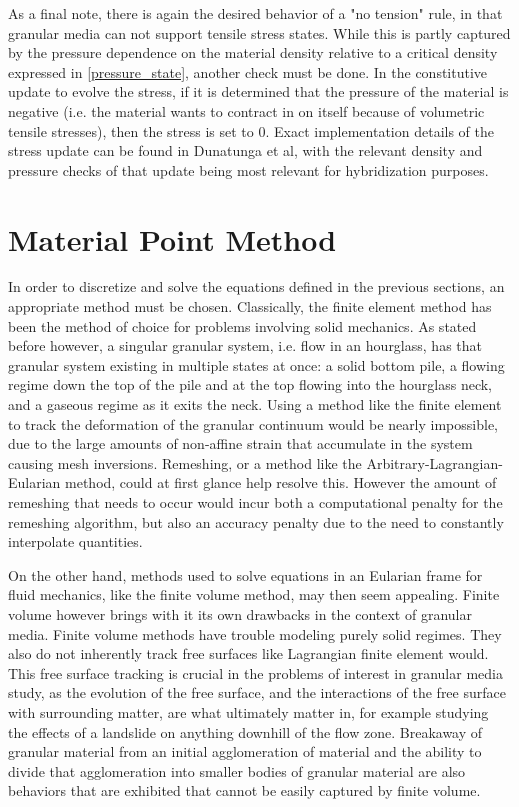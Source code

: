 As a final note, there is again the desired behavior of a "no tension" rule, in that granular media can not support tensile stress states. While this is partly captured by the pressure dependence on the material density relative to a critical density expressed in \ref{pressure_state}, another check must be done. In the constitutive update to evolve the stress, if it is determined that the pressure of the material is negative (i.e. the material wants to contract in on itself because of volumetric tensile stresses), then the stress is set to 0. Exact implementation details of the stress update can be found in Dunatunga et al, with the relevant density and pressure checks of that update being most relevant for hybridization purposes. 

\section{Material Point Method}
In order to discretize and solve the equations defined in the previous sections, an appropriate method must be chosen. Classically, the finite element method has been the method of choice for problems involving solid mechanics. As stated before however, a singular granular system, i.e. flow in an hourglass, has that granular system existing in multiple states at once: a solid bottom pile, a flowing regime down the top of the pile and at the top flowing into the hourglass neck, and a gaseous regime as it exits the neck. Using a method like the finite element to track the deformation of the granular continuum would be nearly impossible, due to the large amounts of non-affine strain that accumulate in the system causing mesh inversions. Remeshing, or a method like the Arbitrary-Lagrangian-Eularian method, could at first glance help resolve this. However the amount of remeshing that needs to occur would incur both a computational penalty for the remeshing algorithm, but also an accuracy penalty due to the need to constantly interpolate quantities.

On the other hand, methods used to solve equations in an Eularian frame for fluid mechanics, like the finite volume method, may then seem appealing. Finite volume however brings with it its own drawbacks in the context of granular media. Finite volume methods have trouble modeling purely solid regimes. They also do not inherently track free surfaces like Lagrangian finite element would. This free surface tracking is crucial in the problems of interest in granular media study, as the evolution of the free surface, and the interactions of the free surface with surrounding matter, are what ultimately matter in, for example studying the effects of a landslide on anything downhill of the flow zone. Breakaway of granular material from an initial agglomeration of material and the ability to divide that agglomeration into smaller bodies of granular material are also behaviors that are exhibited that cannot be easily captured by finite volume.

